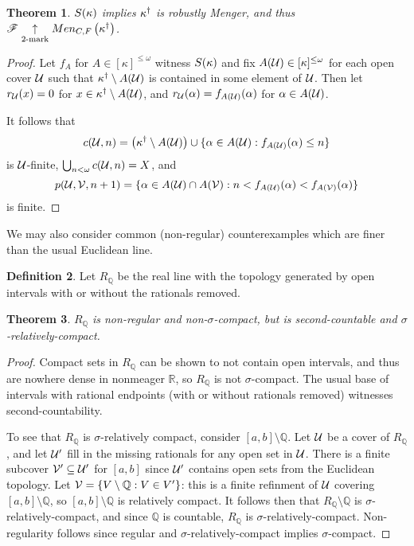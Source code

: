 \documentclass{amsart}
\newtheorem{theorem}{Theorem}[section]
\theoremstyle{definition}
\newtheorem{definition}[theorem]{Definition}
\begin{document}
\begin{theorem}
  \(S(\kappa)\) implies \(\kappa^\dagger\) is
  robustly Menger, and thus
  \(\mathscr{F}\underset{2\text{-mark}}{\uparrow}Men_{C,F}\left({\kappa^\dagger}\right)\).
\end{theorem}

\begin{proof}
  Let \(f_A\) for \(A\in[\kappa]^{\leq\omega}\) witness \(S(\kappa)\) and fix
  \(A(\mathcal{U})\in[\kappa]^{\leq\omega}\) for each open cover \(\mathcal{U}\) such that
  \(\kappa^\dagger\setminus A(\mathcal{U})\) is contained in some element of
  \(\mathcal{U}\).
  Then let \(r_{\mathcal{U}}(x)=0\) for \(x\in\kappa^\dagger\setminus A(\mathcal{U})\),
  and \(r_{\mathcal{U}}(\alpha)=f_{A(\mathcal{U})}(\alpha)\) for \(\alpha\in A(\mathcal{U})\).

  It follows that
    \[
      c(\mathcal{U},n)
        =
      \left(\kappa^\dagger\setminus A(\mathcal{U})\right)
        \cup
      \{\alpha\in A(\mathcal{U}) : f_{A(\mathcal{U})}(\alpha)\leq n \}
    \]
  is \(\mathcal{U}\)-finite, \(\bigcup_{n<\omega}c(\mathcal{U},n)=X\), and
    \[
      p(\mathcal{U},\mathcal{V},n+1)
        =
      \{
        \alpha\in A(\mathcal{U})\cap A(\mathcal{V})
          :
        n < f_{A(\mathcal{U})}(\alpha) < f_{A(\mathcal{V})}(\alpha)
      \}
    \]
  is finite.
\end{proof}

We may also consider common (non-regular) counterexamples which are finer
than the usual Euclidean line.

\begin{definition}
  Let \(R_{\mathbb Q}\) be the real line with the topology generated by open
  intervals with or without the rationals removed.
\end{definition}

\begin{theorem}
  \(R_{\mathbb Q}\) is non-regular and non-\(\sigma\)-compact, but is
  second-countable and \(\sigma\)-relatively-compact.
\end{theorem}

\begin{proof}
  Compact sets in \(R_{\mathbb Q}\) can be shown to not contain open intervals,
  and thus are nowhere dense in nonmeager \(\mathbb R\),
  so \(R_{\mathbb Q}\) is not \(\sigma\)-compact. The usual base of
  intervals with rational endpoints (with or without rationals removed)
  witnesses second-countability.

  To see that \(R_{\mathbb Q}\) is \(\sigma\)-relatively compact, consider
  \([a,b]\setminus\mathbb{Q}\). Let \(\mathcal{U}\) be a cover of \(R_{\mathbb Q}\), and
  let \(\mathcal{U}'\) fill in the missing rationals for any open set in \(\mathcal{U}\).
  There is a finite subcover \(\mathcal{V}'\subseteq \mathcal{U}'\) for \([a,b]\) since
  \(\mathcal{U}'\) contains open sets from the Euclidean topology. Let
  \(\mathcal{V}= \{V\setminus\mathbb{Q}:V\in V'\}\): this is a finite refinment of
  \(\mathcal{U}\) covering \([a,b]\setminus\mathbb{Q}\), so \([a,b]\setminus\mathbb{Q}\)
  is relatively compact. It follows then that \(R_{\mathbb Q}\setminus\mathbb Q\)
  is \(\sigma\)-relatively-compact, and since \(\mathbb Q\) is countable,
  \(R_{\mathbb Q}\) is \(\sigma\)-relatively-compact. Non-regularity follows since
  regular and \(\sigma\)-relatively-compact implies \(\sigma\)-compact.
\end{proof}
\end{document}
